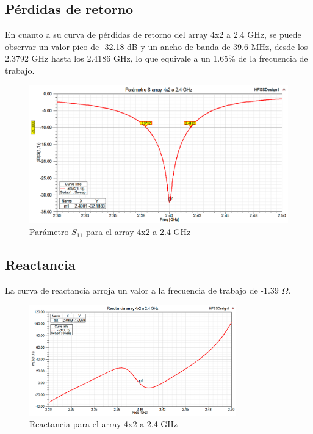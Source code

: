 \subsection{Pérdidas de retorno}
\par En cuanto a su curva de pérdidas de retorno del array 4x2 a 2.4 GHz, se puede observar un valor pico de -32.18 dB y un ancho de banda de 39.6 MHz, desde los 2.3792 GHz hasta los 2.4186 GHz, lo que equivale a un 1.65\% de la frecuencia de trabajo.
\\
\begin{figure}[H]
    \centering
        \includegraphics[width=\textwidth]{archivos/analisis/4x21/1}
        \caption{Parámetro $S_{11}$ para el array 4x2 a 2.4 GHz}
        \label{fig:s4x21}
\end{figure}

\newpage
\subsection{Reactancia}
\par La curva de reactancia arroja un valor a la frecuencia de trabajo de -1.39 $\Omega$. 
\\
\begin{figure}[H]
    \centering
        \includegraphics[width=0.8\textwidth]{archivos/analisis/4x21/2}
        \caption{Reactancia para el array 4x2 a 2.4 GHz}
        \label{fig:react4x21}
\end{figure}

